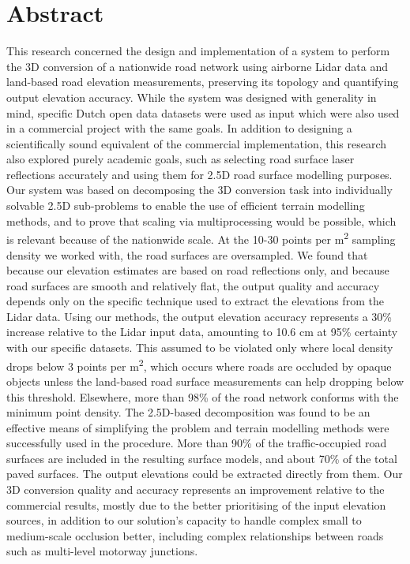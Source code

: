 \chapter*{Abstract}

This research concerned the design and implementation of a system to perform the 3D conversion of a nationwide road network using airborne Lidar data and land-based road elevation measurements, preserving its topology and quantifying output elevation accuracy. While the system was designed with generality in mind, specific Dutch open data datasets were used as input which were also used in a commercial project with the same goals. In addition to designing a scientifically sound equivalent of the commercial implementation, this research also explored purely academic goals, such as selecting road surface laser reflections accurately and using them for 2.5D road surface modelling purposes. Our system was based on decomposing the 3D conversion task into individually solvable 2.5D sub-problems to enable the use of efficient terrain modelling methods, and to prove that scaling via multiprocessing would be possible, which is relevant because of the nationwide scale. At the 10-30 points per m\textsuperscript{2} sampling density we worked with, the road surfaces are oversampled. We found that because our elevation estimates are based on road reflections only, and because road surfaces are smooth and relatively flat, the output quality and accuracy depends only on the specific technique used to extract the elevations from the Lidar data. Using our methods, the output elevation accuracy represents a 30\% increase relative to the Lidar input data, amounting to 10.6 cm at 95\% certainty with our specific datasets. This assumed to be violated only where local density drops below 3 points per m\textsuperscript{2}, which occurs where roads are occluded by opaque objects unless the land-based road surface measurements can help dropping below this threshold. Elsewhere, more than 98\% of the road network conforms with the minimum point density. The 2.5D-based decomposition was found to be an effective means of simplifying the problem and terrain modelling methods were successfully used in the procedure. More than 90\% of the traffic-occupied road surfaces are included in the resulting surface models, and about 70\% of the total paved surfaces. The output elevations could be extracted directly from them. Our 3D conversion quality and accuracy represents an improvement relative to the commercial results, mostly due to the better prioritising of the input elevation sources, in addition to our solution's capacity to handle complex small to medium-scale occlusion better, including complex relationships between roads such as multi-level motorway junctions.